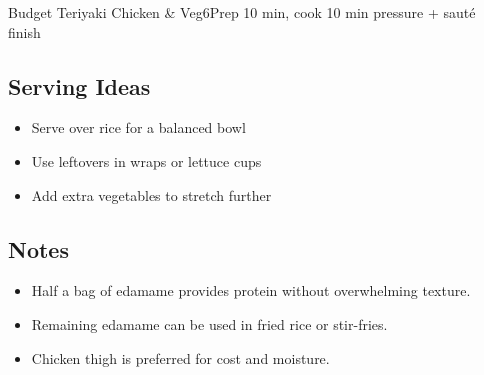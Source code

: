 \begin{recipebox}{Budget Teriyaki Chicken \& Veg}{6}{Prep 10 min, cook 10 min pressure + sauté finish}
\subsection*{Serving Ideas}
\begin{itemize}
    \item Serve over rice for a balanced bowl
    \item Use leftovers in wraps or lettuce cups
    \item Add extra vegetables to stretch further
\end{itemize}

\subsection*{Notes}
\begin{itemize}
    \item Half a bag of edamame provides protein without overwhelming texture.
    \item Remaining edamame can be used in fried rice or stir-fries.
    \item Chicken thigh is preferred for cost and moisture.
\end{itemize}
\end{recipebox}
